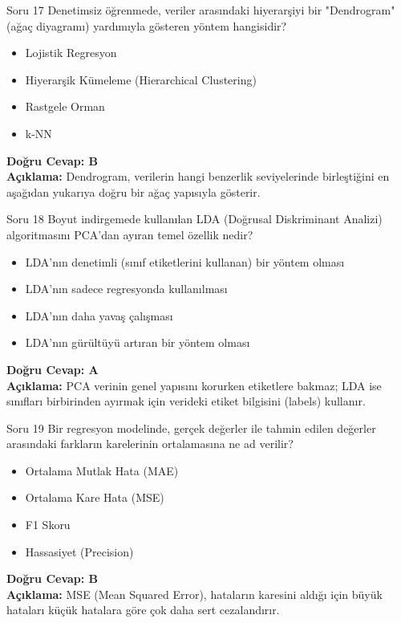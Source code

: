 \documentclass[12pt,a4paper]{article}
\begin{document}
\begin{testcard}{Soru 17}
    Denetimsiz öğrenmede, veriler arasındaki hiyerarşiyi bir "Dendrogram" (ağaç diyagramı) yardımıyla gösteren yöntem hangisidir?
    \begin{itemize}
        \item[A)] Lojistik Regresyon
        \item[B)] Hiyerarşik Kümeleme (Hierarchical Clustering)
        \item[C)] Rastgele Orman
        \item[D)] k-NN
    \end{itemize}
    \tcblower
    \textbf{Doğru Cevap: B} \\
    \textbf{Açıklama:} Dendrogram, verilerin hangi benzerlik seviyelerinde birleştiğini en aşağıdan yukarıya doğru bir ağaç yapısıyla gösterir.
\end{testcard}

\begin{testcard}{Soru 18}
    Boyut indirgemede kullanılan LDA (Doğrusal Diskriminant Analizi) algoritmasını PCA'dan ayıran temel özellik nedir?
    \begin{itemize}
        \item[A)] LDA'nın denetimli (sınıf etiketlerini kullanan) bir yöntem olması
        \item[B)] LDA'nın sadece regresyonda kullanılması
        \item[C)] LDA'nın daha yavaş çalışması
        \item[D)] LDA'nın gürültüyü artıran bir yöntem olması
    \end{itemize}
    \tcblower
    \textbf{Doğru Cevap: A} \\
    \textbf{Açıklama:} PCA verinin genel yapısını korurken etiketlere bakmaz; LDA ise sınıfları birbirinden ayırmak için verideki etiket bilgisini (labels) kullanır.
\end{testcard}

\begin{testcard}{Soru 19}
    Bir regresyon modelinde, gerçek değerler ile tahmin edilen değerler arasındaki farkların karelerinin ortalamasına ne ad verilir?
    \begin{itemize}
        \item[A)] Ortalama Mutlak Hata (MAE)
        \item[B)] Ortalama Kare Hata (MSE)
        \item[C)] F1 Skoru
        \item[D)] Hassasiyet (Precision)
    \end{itemize}
    \tcblower
    \textbf{Doğru Cevap: B} \\
    \textbf{Açıklama:} MSE (Mean Squared Error), hataların karesini aldığı için büyük hataları küçük hatalara göre çok daha sert cezalandırır.
\end{testcard}
\end{document}
